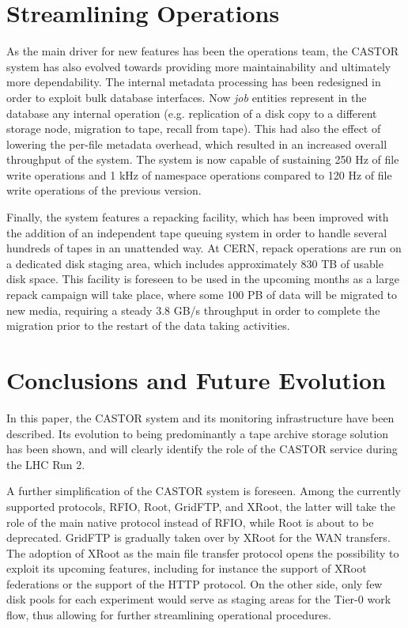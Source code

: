 \documentclass[a4paper]{jpconf}
\begin{document}
\section{Streamlining Operations}

As the main driver for new features has been the operations team, the CASTOR system has also evolved towards providing more maintainability and ultimately more dependability. The internal metadata processing has been redesigned in order to exploit bulk database interfaces. Now \textit{job} entities represent in the database any internal operation (e.g. replication of a disk copy to a different storage node, migration to tape, recall from tape). This had also the effect of lowering the per-file metadata overhead, which resulted in an increased overall throughput of the system. The system is now capable of sustaining 250 Hz of file write operations and 1 kHz of namespace operations compared to 120 Hz of file write operations of the previous version.

Finally, the system features a repacking facility, which has been improved with the addition of an independent tape queuing system in order to handle several hundreds of tapes in an unattended way. At CERN, repack operations \cite{repack} are run on a dedicated disk staging area, which includes approximately 830 TB of usable disk space. This facility is foreseen to be used in the upcoming months as a large repack campaign will take place, where some 100 PB of data will be migrated to new media, requiring a steady 3.8 GB/s throughput in order to complete the migration prior to the restart of the data taking activities.





\section{Conclusions and Future Evolution}

In this paper, the CASTOR system and its monitoring infrastructure have been described. Its evolution to being predominantly a tape archive storage solution has been shown, and will clearly identify the role of the CASTOR service during the LHC Run 2.

A further simplification of the CASTOR system is foreseen. Among the currently supported protocols, RFIO, Root, GridFTP, and XRoot, the latter will take the role of the main native protocol instead of RFIO, while Root is about to be deprecated. GridFTP is gradually taken over by XRoot for the WAN transfers. The adoption of XRoot as the main file transfer protocol opens the possibility to exploit its upcoming features, including for instance the support of XRoot federations or the support of the HTTP protocol.
On the other side, only few disk pools for each experiment would serve as staging areas for the Tier-0 work flow, thus allowing for further streamlining operational procedures.
\end{document}
